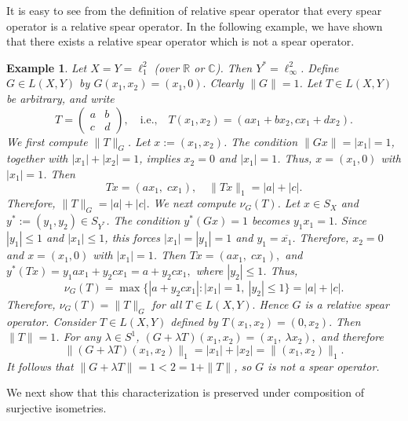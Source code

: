 \documentclass[12pt]{amsart}
\newtheorem{example}[theorem]{Example}
\theoremstyle{definition}
\numberwithin{equation}{section}
\begin{document}
    It is easy to see from the definition of relative spear operator that every spear operator is a relative spear operator. In the following example, we have shown that there exists a relative spear operator which is not a spear operator.
    

    \begin{example}
        Let $X = Y = \ell_1^2$ (over $\mathbb{R}$ or $\mathbb{C}$). Then $Y^* = \ell_\infty^2$. Define $G \in L(X,Y)$ by $G(x_1,x_2) = (x_1,0).$ Clearly $\|G\|=1$. Let $T \in L(X,Y)$ be arbitrary, and write
        \[
        T = \begin{pmatrix} 
        a & b \\ c & d 
        \end{pmatrix}, \quad \text{i.e.,}\quad T(x_1,x_2) = (a x_1 + b x_2, c x_1 + d x_2).
        \]
        We first compute $\|T\|_G$. Let $x:=(x_1, x_2)$. The condition $\|Gx\| = |x_1| = 1$, together with $|x_1|+|x_2|=1$, implies $x_2=0$ and $|x_1|=1$. Thus, $x=(x_1,0)$ with $|x_1|=1$. Then
        \[
        Tx = (ax_1,\; cx_1), \quad \|Tx\|_1 = |a| + |c|.
        \]
        Therefore, $\|T\|_G = |a| + |c|.$ We next compute $\nu_G(T)$. Let $x\in S_X$ and $y^*:=(y_1,y_2)\in S_{Y^*}$. The condition $y^*(Gx)=1$ becomes $y_1 x_1 = 1.$ Since $|y_1|\le1$ and $|x_1|\le1$, this forces $|x_1|=|y_1|=1$ and $y_1=\overline{x_1}$. Therefore, $x_2=0$ and $x=(x_1,0)$ with $|x_1|=1$. Then $Tx = (a x_1,\; c x_1),$ and $y^*(Tx) = y_1 a x_1 + y_2 c x_1 = a + y_2 c x_1,$ where $|y_2|\le1$. Thus, 
        \[
        \nu_G(T) = \max\{|a + y_2 c x_1|: |x_1|=1,\ |y_2|\le1\}= |a| + |c|.
        \]
        Therefore, $\nu_G(T) = \|T\|_G$ for all $T \in L(X,Y).$ Hence $G$ is a relative spear operator. Consider $T \in L(X,Y)$ defined by $T(x_1,x_2) = (0,x_2).$ Then $\|T\|=1$. For any $\lambda \in S^1$, $(G+\lambda T)(x_1,x_2) = (x_1,\ \lambda x_2),$ and therefore
        \[
        \|(G+\lambda T)(x_1,x_2)\|_1 = |x_1| + |x_2| = \|(x_1,x_2)\|_1.
        \]
        It follows that $\|G+\lambda T\|=1 < 2 = 1+\|T\|$, so $G$ is not a spear operator.
        \end{example}

    
	
	We next show that this characterization is preserved under composition of surjective isometries.
	
\end{document}
